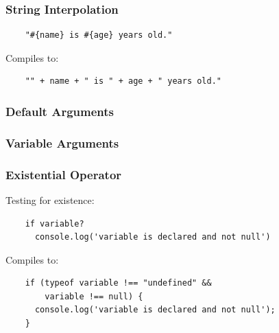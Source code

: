 \documentclass{beamer}
\begin{document}
\begin{frame}[fragile]
  \frametitle{String Interpolation}
 
  \begin{verbatim}
    "#{name} is #{age} years old."
  \end{verbatim}

  \pause
  \vspace{.5cm}
  Compiles to:
  \vspace{.5cm}

  \begin{verbatim}
    "" + name + " is " + age + " years old."
  \end{verbatim}  
\end{frame}

\begin{frame}
  \frametitle{Default Arguments}
  
\end{frame}

\begin{frame}
\frametitle{Variable Arguments}

\end{frame}

%
%
 \begin{frame}[fragile]
  \frametitle{Existential Operator}


  Testing for existence:

  \begin{verbatim}
    if variable?
      console.log('variable is declared and not null')
  \end{verbatim}

  \pause
  \vspace{.5cm}
  Compiles to:
  \vspace{.5cm}


  \begin{verbatim}
    if (typeof variable !== "undefined" && 
        variable !== null) {
      console.log('variable is declared and not null');
    }
  \end{verbatim}  
\end{frame}
\end{document}
